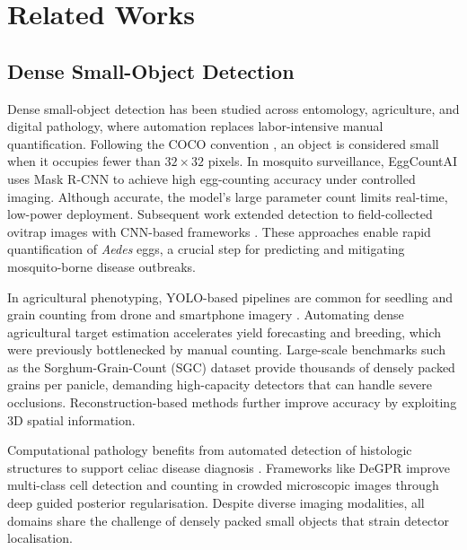 %
%
%                 

\chapter{Related Works}
\label{sec:relatedworks}

\section{Dense Small-Object Detection}

Dense small-object detection \cite{smallObject1,smallObject2} has been studied across entomology, agriculture, and digital pathology, where automation replaces labor-intensive manual quantification. Following the COCO convention \cite{Lin2014COCO}, an object is considered small when it occupies fewer than $32 \times 32$ pixels. In mosquito surveillance, EggCountAI \cite{Javed2023} uses Mask R-CNN to achieve high egg-counting accuracy under controlled imaging. Although accurate, the model's large parameter count limits real-time, low-power deployment. Subsequent work extended detection to field-collected ovitrap images with CNN-based frameworks \cite{Hamesse2023,NaranjoAlcazar2024,vicente2024aedesaegyptieggcounting}. These approaches enable rapid quantification of \textit{Aedes} eggs, a crucial step for predicting and mitigating mosquito-borne disease outbreaks.

In agricultural phenotyping, YOLO-based pipelines are common for seedling and grain counting from drone \cite{Chen2024} and smartphone imagery \cite{Santiago2024}. Automating dense agricultural target estimation accelerates yield forecasting and breeding, which were previously bottlenecked by manual counting. Large-scale benchmarks such as the Sorghum-Grain-Count (SGC) dataset \cite{Bakshi2025} provide thousands of densely packed grains per panicle, demanding high-capacity detectors that can handle severe occlusions. Reconstruction-based methods \cite{Freeman2023} further improve accuracy by exploiting 3D spatial information.

\begin{sloppypar}
Computational pathology benefits from automated detection of histologic structures to support celiac disease diagnosis \cite{Stoleru2022,Sali2019}. Frameworks like DeGPR \cite{Tyagi2023} improve multi-class cell detection and counting in crowded microscopic images through deep guided posterior regularisation. Despite diverse imaging modalities, all domains share the challenge of densely packed small objects that strain detector localisation.
\end{sloppypar}

